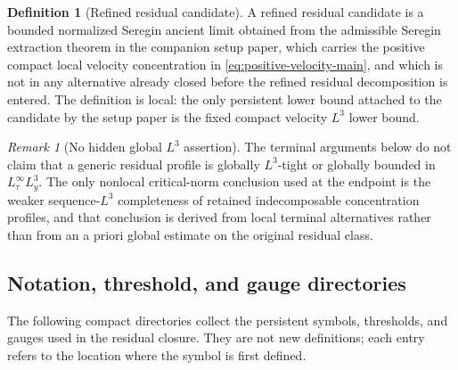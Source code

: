 \documentclass[11pt]{amsart}
\numberwithin{equation}{section}
\theoremstyle{plain}
\theoremstyle{definition}
\newtheorem{definition}[definition]{Definition}
\theoremstyle{remark}
\newtheorem{remark}[remark]{Remark}
\begin{document}
\begin{definition}[Refined residual candidate]
\label{def:refined-residual-candidate}
A refined residual candidate is a bounded normalized Seregin ancient limit
obtained from the admissible Seregin extraction theorem in the companion setup
paper, which carries the positive compact local velocity
concentration in \eqref{eq:positive-velocity-main}, and which is not in any alternative
already closed before the refined residual decomposition is entered.  The
definition is local: the only persistent lower bound attached to the candidate by
the setup paper is the fixed compact velocity \(L^3\) lower bound.
\end{definition}

\begin{remark}[No hidden global \(L^3\) assertion]
\label{rem:no-hidden-global-L3}
The terminal arguments below do not claim that a generic residual profile is
globally \(L^3\)-tight or globally bounded in \(L^\infty_\tau L^3_y\).  The
only nonlocal critical-norm conclusion used at the endpoint is the weaker
sequence-\(L^3\) completeness of retained indecomposable concentration
profiles, and that conclusion is derived from local terminal alternatives rather than from an
a priori global estimate on the original residual class.
\end{remark}

\subsection{Notation, threshold, and gauge directories}
\label{subsec:notation-directories}

The following compact directories collect the persistent symbols, thresholds,
and gauges used in the residual closure.  They are not new definitions; each
entry refers to the location where the symbol is first defined.
\end{document}
